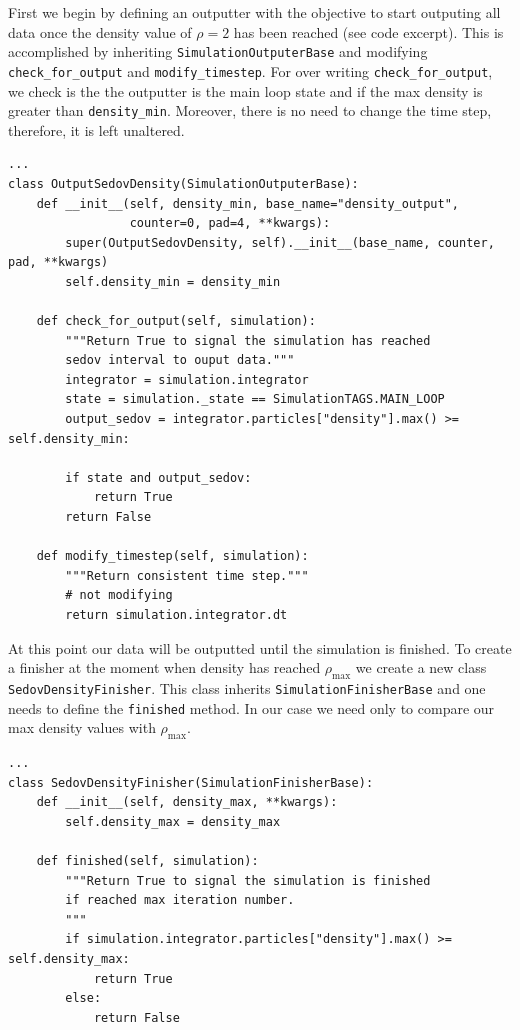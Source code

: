 First we begin by defining an outputter with the objective to start outputing
all data once the density value of $\rho=2$ has been reached (see code excerpt). This
is accomplished by inheriting \lstinline{SimulationOutputerBase} and modifying
\lstinline{check_for_output} and \lstinline{modify_timestep}. For over writing
\lstinline{check_for_output}, we check is the the outputter is the main loop state
and if the max density is greater than \lstinline{density_min}. Moreover, there
is no need to change the time step, therefore, it is left unaltered.


\begin{lstlisting}
...
class OutputSedovDensity(SimulationOutputerBase):
    def __init__(self, density_min, base_name="density_output",
                 counter=0, pad=4, **kwargs):
        super(OutputSedovDensity, self).__init__(base_name, counter, pad, **kwargs)
        self.density_min = density_min 

    def check_for_output(self, simulation):
        """Return True to signal the simulation has reached
        sedov interval to ouput data."""
        integrator = simulation.integrator
        state = simulation._state == SimulationTAGS.MAIN_LOOP
        output_sedov = integrator.particles["density"].max() >= self.density_min:

        if state and output_sedov:
            return True
        return False

    def modify_timestep(self, simulation):
        """Return consistent time step."""
        # not modifying
        return simulation.integrator.dt

\end{lstlisting}
At this point our data will be outputted until the simulation is finished. To
create a finisher at the moment when density has reached $\rho_{\mathrm{max}}$
we create a new class \lstinline{SedovDensityFinisher}. This class inherits
\lstinline{SimulationFinisherBase} and one needs to define the \lstinline{finished}
method. In our case we need only to compare our max density values with
$\rho_{\mathrm{max}}$.
\begin{lstlisting}
...
class SedovDensityFinisher(SimulationFinisherBase):
    def __init__(self, density_max, **kwargs):
        self.density_max = density_max

    def finished(self, simulation):
        """Return True to signal the simulation is finished
        if reached max iteration number.
        """
        if simulation.integrator.particles["density"].max() >= self.density_max:
            return True
        else:
            return False

\end{lstlisting}

